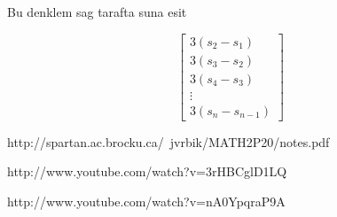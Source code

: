 \documentclass[12pt,fleqn]{article}\usepackage{common}
\begin{document}
Bu denklem sag tarafta suna esit 

\[ 
\left[\begin{array}{r}
3(s_2 - s_1) \\
3(s_3 - s_2) \\
3(s_4 - s_3) \\
\vdots \\
3(s_n - s_{n-1}) 
\end{array}\right]
 \]












http://spartan.ac.brocku.ca/~jvrbik/MATH2P20/notes.pdf

http://www.youtube.com/watch?v=3rHBCglD1LQ

http://www.youtube.com/watch?v=nA0YpqraP9A
\end{document}
